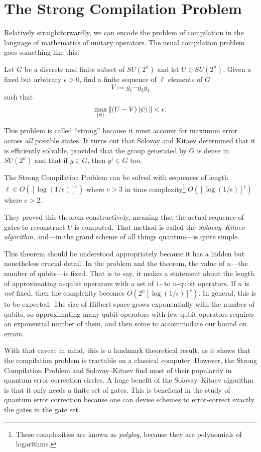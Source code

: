 \section{The Strong Compilation Problem}
Relatively straightforwardly, we can encode the problem of compilation in the language of mathematics of unitary operators. The usual compilation problem goes something like this:
\begin{problem}\label{prob:strongcomp}
Let $G$ be a discrete and finite subset of $SU(2^n)$ and let $U\in SU(2^n)$. Given a fixed but arbitrary $\epsilon > 0$, find a finite sequence of $\ell$ elements of $G$ \[V := g_\ell\cdots g_2g_1\] such that \[\max_{\ket{\psi}}\Vert (U - V)\ket{\psi}\Vert < \epsilon.\]
\end{problem}
This problem is called ``strong'' because it must account for maximum error across \emph{all} possible states. It turns out that Solovay and Kitaev determined that it is efficiently solvable, provided that the group generated by $G$ is dense in $SU(2^n)$ and that if $g\in G$, then $g^{\dagger}\in G$ too.
\begin{theorem}
The Strong Compilation Problem can be solved with sequences of length $\ell\in O([\log(1/\epsilon)]^c)$ where $c > 3$ in time complexity\footnote{These complexities are known as \emph{polylog}, because they are polynomials of logarithms.} $O([\log(1/\epsilon)]^c)$ where $c > 2$.
\end{theorem}
They proved this theorem constructively, meaning that the actual sequence of gates to reconstruct $U$ is computed. That method is called the \emph{Solovay--Kitaev algorithm}, and---in the grand scheme of all things quantum---is quite simple.

This theorem should be understood appropriately because it has a hidden but nonetheless crucial detail. In the problem and the theorem, the value of $n$---the number of qubits---is fixed. That is to say, it makes a statement about the length of approximating $n$-qubit operators with a set of $1$- to $n$-qubit operators. If $n$ is \emph{not} fixed, then the complexity becomes $O(2^n[\log(1/\epsilon)]^c)$. In general, this is to be expected. The size of Hilbert space grows exponentially with the number of qubits, so approximating many-qubit operators with few-qubit operators requires an exponential number of them, and then some to accommodate our bound on errors.

With that caveat in mind, this is a landmark theoretical result, as it shows that the compilation problem is tractable on a classical computer. However, the Strong Compilation Problem and Solovay--Kitaev find most of their popularity in quantum error correction circles. A huge benefit of the Solovay--Kitaev algorithm is that it only needs a finite set of gates. This is beneficial in the study of quantum error correction because one can devise schemes to error-correct exactly the gates in the gate set.

